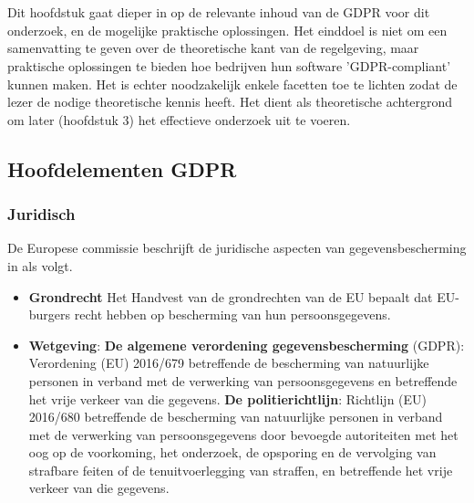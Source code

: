 \chapter{}
\label{ch:stand-van-zaken}



Dit hoofdstuk gaat dieper in op de relevante inhoud van de GDPR voor dit onderzoek, en de mogelijke praktische oplossingen. 
Het einddoel is niet om een samenvatting te geven over de theoretische kant van de regelgeving, maar praktische oplossingen te bieden hoe bedrijven hun software 'GDPR-compliant' kunnen maken. 
Het is echter noodzakelijk enkele facetten toe te lichten zodat de lezer de nodige theoretische kennis heeft.
 Het dient als theoretische achtergrond om later (hoofdstuk 3) het effectieve onderzoek uit te voeren.
\section{{Hoofdelementen GDPR}}

\subsection{Juridisch}
De Europese commissie beschrijft de juridische aspecten van gegevensbescherming in \autocite{Eucom2018} als volgt.

\begin{itemize}
    \item \textbf{Grondrecht} Het Handvest van de grondrechten van de EU bepaalt dat EU-burgers recht hebben op bescherming van hun persoonsgegevens.
    \item \textbf{Wetgeving}: 
    \subitem \textbf{De algemene verordening gegevensbescherming} (GDPR): 
    Verordening (EU) 2016/679 betreffende de bescherming van natuurlijke personen in verband met de verwerking van persoonsgegevens en betreffende het vrije verkeer van die gegevens.
    \subitem \textbf{De politierichtlijn}: 
    Richtlijn (EU) 2016/680 betreffende de bescherming van natuurlijke personen in verband met de verwerking van persoonsgegevens door bevoegde autoriteiten met het oog op de voorkoming, het onderzoek, de opsporing en de vervolging van strafbare feiten of de tenuitvoerlegging van straffen, en betreffende het vrije verkeer van die gegevens.
   
\end{itemize}

